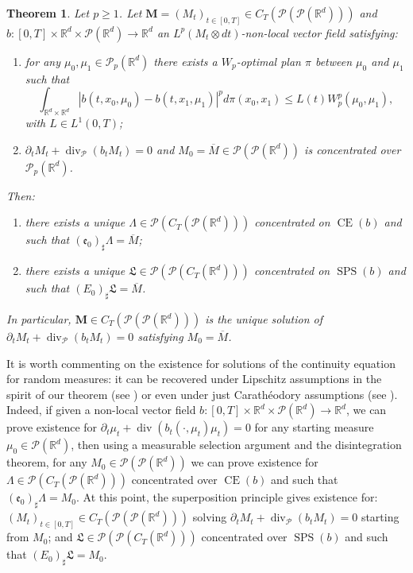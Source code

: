 \documentclass[10pt,leqno]{amsart}
\numberwithin{equation}{section}
\newtheorem{teorema}{Theorem}[section]
\newcommand{\R}{\mathbb{R}}
\newcommand{\PP}{\mathcal{P}}
\newcommand{\CE}{\operatorname{CE}}
\begin{document}
\begin{teorema}\label{main uniqueness theorem}
    Let $p\geq 1$. Let $\boldsymbol{M} = (M_t)_{t\in [0,T]} \in C_T(\PP(\PP(\R^d)))$ and $b:[0,T]\times \R^d \times \PP(\R^d)\to \R^d$ an $L^p(M_t\otimes dt)$-non-local vector field satisfying:
    \begin{enumerate}
        \item\label{cond 2 weak uniqueness} for any $\mu_0,\mu_1\in \PP_p(\R^d)$ there exists a $W_p$-optimal plan $\pi$ between $\mu_0$ and $\mu_1$ such that \begin{equation}\label{eq: Lip condition}
            \int_{\R^d\times \R^d}|b(t,x_0,\mu_0) - b(t,x_1,\mu_1)|^p d\pi(x_0,x_1) \leq L(t)  W_p^p(\mu_0,\mu_1),
        \end{equation}
        with $L \in L^1(0,T)$;
        \item $\partial_tM_t + \operatorname{div}_\PP(b_t M_t) = 0$ and $M_0=\overline{M}\in \PP(\PP(\R^d))$ is concentrated over $\PP_p(\R^d)$.
    \end{enumerate}
    Then:
    \begin{enumerate}
        \item[(i)] there exists a unique $\Lambda \in \PP(C_T(\PP(\R^d)))$ concentrated on $\operatorname{CE}(b)$ and such that $(\mathfrak{e}_0)_\sharp \Lambda = \overline{M}$;
        \item[(ii)] there exists a unique $\mathfrak{L} \in \PP(\PP(C_T(\R^d)))$ concentrated on $\operatorname{SPS}(b)$ and such that $(E_0)_\sharp \mathfrak{L} = \overline{M}$.
    \end{enumerate}
    In particular, $\boldsymbol{M} \in C_T(\PP(\PP(\R^d)))$ is the unique solution of $\partial_t M_t + \operatorname{div}_\PP(b_tM_t) = 0$ satisfying $M_0 = \overline{M}$.
\end{teorema}


    It is worth commenting on the existence for solutions of the continuity equation for random measures: it can be recovered under Lipschitz assumptions in the spirit of our theorem (see \cite{cavagnari2022lagrangian, bonnet2021differential}) or even under just Carathéodory assumptions (see \cite{bonnet2024caratheodory}). Indeed, if given a non-local vector field $b:[0,T]\times \R^d \times \PP(\R^d) \to \R^d$, we can prove existence for $\partial_t \mu_t + \operatorname{div}(b_t(\cdot,\mu_t)\mu_t) = 0$ for any starting measure $\mu_0\in \PP(\R^d)$, then using a measurable selection argument and the disintegration theorem, for any $M_0\in \PP(\PP(\R^d))$ we can prove existence for $\Lambda \in \PP(C_T(\PP(\R^d)))$ concentrated over $\CE(b)$ and such that $(\mathfrak{e}_0)_\sharp \Lambda = M_0$. At this point, the superposition principle gives existence for: $(M_t)_{t\in [0,T]} \in C_T(\PP(\PP(\R^d)))$ solving $\partial_t M_t + \operatorname{div}_\PP(b_tM_t) = 0$ starting from $M_0$; and $\mathfrak{L}\in \PP(\PP(C_T(\R^d)))$ concentrated over $\operatorname{SPS}(b)$ and such that $(E_0)_\sharp \mathfrak{L} = M_0$.
\end{document}
